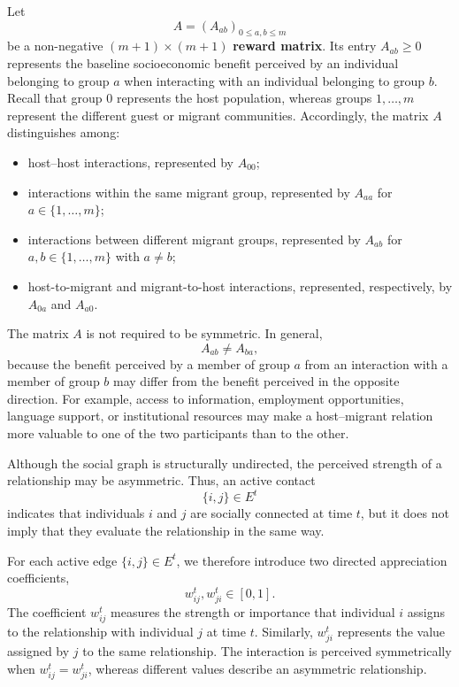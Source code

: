 \documentclass[11pt,a4paper]{article}
\begin{document}
	Let
	$$
	A = (A_{ab})_{0\leq a,b\leq m}
	$$
	be a non-negative $(m+1)\times(m+1)$ \textbf{reward matrix}. Its entry $
	A_{ab}\geq 0$ represents the baseline socioeconomic benefit perceived by an individual belonging to group $a$ when interacting with an individual belonging to group $b$. Recall that group $0$ represents the host population, whereas
	groups $1,\ldots,m$ represent the different guest or migrant
	communities. Accordingly, the matrix $A$ distinguishes among:
	
	\begin{itemize}[leftmargin=1.5em]
		\item host--host interactions, represented by $A_{00}$;
		
		\item interactions within the same migrant group, represented by $A_{aa}$ for $a\in\{1,\ldots,m\}$;
		
		\item interactions between different migrant groups, represented by $A_{ab}$ for $a,b\in\{1,\ldots,m\}$ with $a\neq b$;
		
		\item host-to-migrant and migrant-to-host interactions, represented, respectively, by $A_{0a}$ and $A_{a0}$.
	\end{itemize}
	
	The matrix $A$ is not required to be symmetric. In general,
	$$
	A_{ab}\neq A_{ba},
	$$
	because the benefit perceived by a member of group $a$ from an
	interaction with a member of group $b$ may differ from the benefit perceived in the opposite direction. For example, access to information, employment opportunities, language support, or institutional resources may make a host--migrant relation more valuable to one of the two participants than to the other.
	
	Although the social graph is structurally undirected, the perceived strength of a relationship may be asymmetric. Thus, an active contact
	$$
	\{i,j\}\in E^t
	$$
	indicates that individuals $i$ and $j$ are socially connected at time $t$, but it does not imply that they evaluate the relationship in the same way.
	
	For each active edge $\{i,j\}\in E^t$, we therefore introduce two directed appreciation coefficients,
	$$
	w_{ij}^t,w_{ji}^t\in[0,1].
	$$
	The coefficient $w_{ij}^t$ measures the strength or importance that individual $i$ assigns to the relationship with individual $j$ at time $t$. Similarly, $w_{ji}^t$ represents the value assigned by $j$ to the same relationship. The interaction is perceived symmetrically when $w_{ij}^t = w_{ji}^t$, whereas different values describe an asymmetric relationship.
\end{document}
